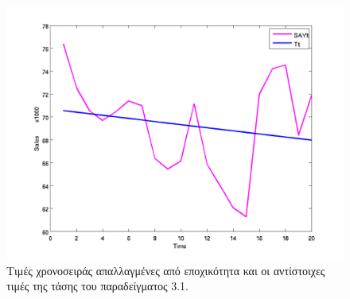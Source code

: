 \begin{table} [h]
\begin{center}
\begin{tabular}{|c|c|c|c|c|c|c|c|}
      \hline
    \end{tabular}
  \end{center}
\end{table}

\begin{figure} [ht]
  \centering
  \includegraphics[totalheight=4in,angle=0]{graff4.png}
  \caption{Τιμές χρονοσειράς απαλλαγμένες από εποχικότητα και οι αντίστοιχες τιμές της τάσης του παραδείγματος 3.1.}
\end{figure}


